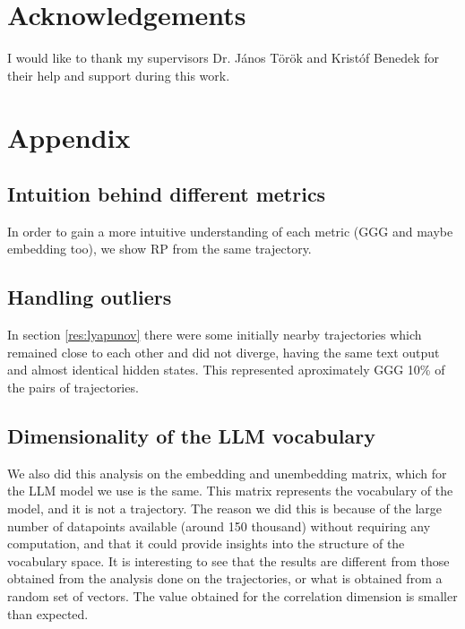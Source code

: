\documentclass[a4paper,12pt]{article}
\begin{document}
\section{Acknowledgements }

I would like to thank my supervisors Dr. János Török and Kristóf Benedek for their help and support during this work.

\newpage



\section{Appendix}
\label{sec:appendix}
\label{sec:appendix}

\subsection{Intuition behind different metrics}

In order to gain a more intuitive understanding of each metric (GGG and maybe embedding too), we show RP from the same trajectory.



\subsection{Handling outliers} %

In section \ref{res:lyapunov} there were some initially nearby trajectories which remained close to each other and did not diverge, having the same text output and almost identical hidden states. This represented aproximately GGG 10\% of the pairs of trajectories.

\subsection{Dimensionality of the LLM vocabulary}
\label{subsec:appendix_vocab_dim}


We also did this analysis on the embedding and unembedding matrix, which for the LLM model we use is the same. This matrix represents the vocabulary of the model, and it is not a trajectory. 
The reason we did this is because of the large number of datapoints available (around 150 thousand) without requiring any computation, and that it could provide insights into the structure of the vocabulary space. It is interesting to see that the results are different from those obtained from the analysis done on the trajectories, or what is obtained from a random set of vectors. The value obtained for the correlation dimension is smaller than expected.
\end{document}
